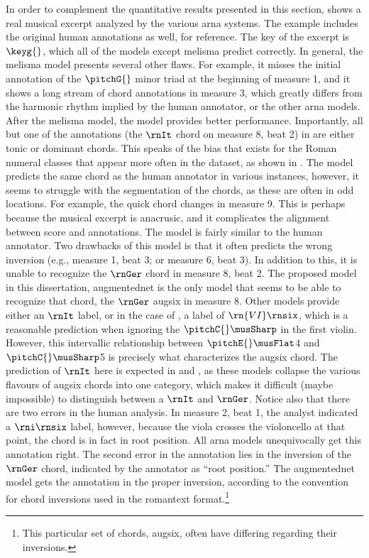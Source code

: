 In order to complement the quantitative results presented in
this section,  shows a real musical
excerpt analyzed by the various \gls{arna} systems. The
example includes the original human annotations as well, for
reference. The key of the excerpt is $\keyg{}$, which all of
the models except \gls{melisma} predict correctly. In
general, the \gls{melisma} model presents several other
flaws. For example, it misses the initial annotation of the
$\pitchG{}$ minor triad at the beginning of measure 1, and
it shows a long stream of chord annotations in measure 3,
which greatly differs from the harmonic rhythm implied by
the human annotator, or the other \gls{arna} models. After
the \gls{melisma} model, the \textcite{chen2021attend} model
provides better performance. Importantly, all but one of the
annotations (the $\rnIt$ chord on measure 8, beat 2) in
\textcite{chen2021attend} are either tonic or dominant
chords. This speaks of the bias that exists for the Roman
numeral classes that appear more often in the dataset, as
shown in . The \textcite{micchi2021deep}
model predicts the same chord as the human annotator in
various instances, however, it seems to struggle with the
segmentation of the chords, as these are often in odd
locations. For example, the quick chord changes in measure
9. This is perhaps because the musical excerpt is anacrusic,
and it complicates the alignment between score and
annotations. The \textcite{mcleod2021modular} model is
fairly similar to the human annotator. Two drawbacks of this
model is that it often predicts the wrong inversion (e.g.,
measure 1, beat 3; or measure 6, beat 3). In addition to
this, it is unable to recognize the $\rnGer$ chord in
measure 8, beat 2. The proposed model in this dissertation,
\gls{augmentednet} is the only model that seems to be able
to recognize that chord, the $\rnGer$ \gls{augsix} in
measure 8. Other models provide either an $\rnIt$ label, or
in the case of \textcite{mcleod2021modular}, a label of
$\rn{VI}\rnsix$, which is a reasonable prediction when
ignoring the $\pitchC{}\musSharp$ in the first violin.
However, this intervallic relationship between
$\pitchE{}\musFlat$4 and $\pitchC{}\musSharp$5 is precisely
what characterizes the \gls{augsix} chord. The prediction of
$\rnIt$ here is expected in \textcite{chen2021attend} and
\textcite{micchi2021deep}, as these models collapse the
various flavours of \gls{augsix} chords into one category,
which makes it difficult (maybe impossible) to distinguish
between a $\rnIt$ and $\rnGer$. Notice also that there are
two errors in the human analysis. In measure 2, beat 1, the
analyst indicated a $\rni\rnsix$ label, however, because the
viola crosses the violoncello at that point, the chord is in
fact in root position. All \gls{arna} models unequivocally
get this annotation right. The second error in the
annotation lies in the inversion of the $\rnGer$ chord,
indicated by the annotator as ``root position.'' The
\gls{augmentednet} model gets the annotation in the proper
inversion, according to the convention for chord inversions
used in the \gls{romantext} format.\footnote{This particular
set of chords, \gls{augsix}, often have differing regarding
their inversions.}

